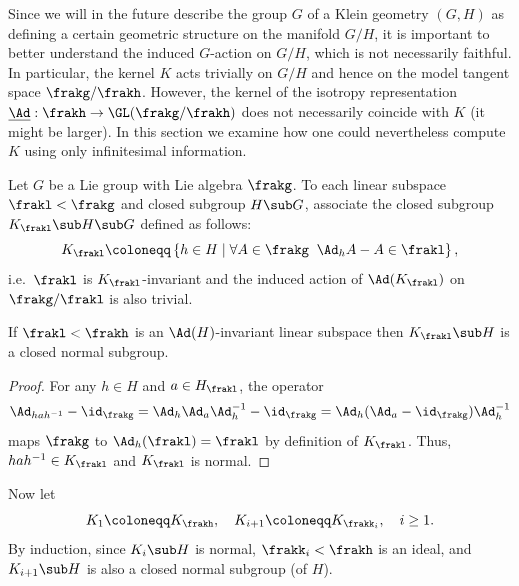 Since we will in the future describe the group $G$ of a Klein geometry $(G,H)$ as defining a certain geometric structure on the manifold $G\slash H$, it is important to better understand the induced $G$-action on $G\slash H$, which is not necessarily faithful. In particular, the kernel $K$ acts trivially on $G\slash H$ and hence on the model tangent space $\frakg\slash\frakh$. However, the kernel of the isotropy representation $\underline{\Ad}:\frakh\to \GL(\frakg\slash\frakh)$ does not necessarily coincide with $K$ (it might be larger). In this section we examine how one could nevertheless compute $K$ using only infinitesimal information.

Let $G$ be a Lie group with Lie algebra $\frakg$. To each linear subspace $\frakl<\frakg$ and closed subgroup $H\sub G$, associate the closed subgroup $K_\frakl\sub H\sub G$ defined as follows:
\[K_\frakl\coloneqq \left\{h\in H\mid \forall A\in\frakg\;\; \Ad_h A-A\in \frakl\right\},\]
i.e.\ $\frakl$ is $K_\frakl$-invariant and the induced action of $\Ad(K_\frakl)$ on $\frakg\slash\frakl$ is also trivial.

\begin{lem}
    If $\frakl<\frakh$ is an $\Ad(H)$-invariant linear subspace then $K_\frakl\sub H$ is a closed normal subgroup.
\end{lem}
\begin{proof}
    For any $h\in H$ and $a\in H_\frakl$, the operator
    \[\Ad_{hah^{-1}}-\id_\frakg=\Ad_h\Ad_a\Ad_h^{-1}-\id_\frakg=\Ad_h(\Ad_a-\id_\frakg)\Ad_h^{-1}\]
    maps $\frakg$ to $\Ad_h (\frakl)=\frakl$ by definition of $K_\frakl$. Thus, $hah^{-1}\in K_\frakl$ and $K_\frakl$ is normal.
\end{proof}

Now let 
\[K_1\coloneqq K_{\frakh},\quad K_{i+1}\coloneqq K_{\frakk_i},\quad i\geq 1.\]
By induction, since $K_i\sub H$ is normal, $\frakk_i<\frakh$ is an ideal, and $K_{i+1}\sub H$ is also a closed normal subgroup (of $H$).

